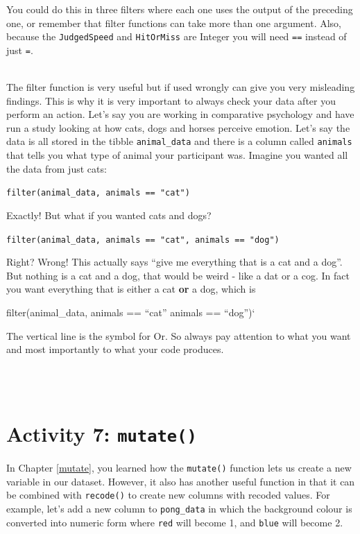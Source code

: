 \documentclass[]{book}
\newenvironment{warning}
    {
    \hline\\
    }
    { 
    \\\\\hline
    }
\begin{document}
You could do this in three filters where each one uses the output of the preceding one, or remember that filter functions can take more than one argument. Also, because the \texttt{JudgedSpeed} and \texttt{HitOrMiss} are Integer you will need \texttt{==} instead of just \texttt{=}.

\begin{warning}
The filter function is very useful but if used wrongly can give you very
misleading findings. This is why it is very important to always check
your data after you perform an action. Let's say you are working in
comparative psychology and have run a study looking at how cats, dogs
and horses perceive emotion. Let's say the data is all stored in the
tibble \texttt{animal\_data} and there is a column called
\texttt{animals} that tells you what type of animal your participant
was. Imagine you wanted all the data from just cats:

\texttt{filter(animal\_data,\ animals\ ==\ "cat")}

Exactly! But what if you wanted cats and dogs?

\texttt{filter(animal\_data,\ animals\ ==\ "cat",\ animals\ ==\ "dog")}

Right? Wrong! This actually says ``give me everything that is a cat and
a dog''. But nothing is a cat and a dog, that would be weird - like a
dat or a cog. In fact you want everything that is either a cat
\textbf{or} a dog, which is

filter(animal\_data, animals == ``cat'' \textbar{} animals == ``dog'')`

The vertical line is the symbol for Or. So always pay attention to what
you want and most importantly to what your code produces.
\end{warning}

\hypertarget{recode}{%
\section{\texorpdfstring{Activity 7: \texttt{mutate()}}{Activity 7: mutate()}}\label{recode}}

In Chapter \ref{mutate}, you learned how the \texttt{mutate()} function lets us create a new variable in our dataset. However, it also has another useful function in that it can be combined with \texttt{recode()} to create new columns with recoded values. For example, let's add a new column to \texttt{pong\_data} in which the background colour is converted into numeric form where \texttt{red} will become 1, and \texttt{blue} will become 2.
\end{document}
